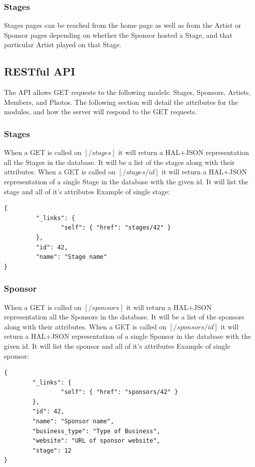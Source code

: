 \documentclass[12pt,english]{scrartcl}
\begin{document}
\subsubsection{Stages}
Stages pages can be reached from the home page as well as from the Artist or Sponsor pages depending on whether the Sponsor hosted a
Stage, and that particular Artist played on that Stage.

\subsection{RESTful  API}
The API allows GET requests to the following models: Stages, Sponsors, Artists, Members, and  Photos.
The following section will detail the attributes for the modules, and how the server will respond to the GET requests.
\subsubsection{Stages}
When a GET is called on $[/stages]$ it will return a HAL+JSON representation all the Stages in the database.  It will be a list of the stages along with their attributes.
When a GET is called on $[/stages/{id}]$ it will return a HAL+JSON representation of a single Stage in the database with the given id.  It will list the stage and all of it's attributes
Example of single stage:
\begin{verbatim}
{
         "_links": {
                "self": { "href": "stages/42" }
         },
         "id": 42,
         "name": "Stage name"
}
\end{verbatim}
\subsubsection{Sponsor}
When a GET is called on $[/sponsors]$ it will return a HAL+JSON representation all the Sponsors in the database.  It will be a list of the sponsors along with their attributes.
When a GET is called on $[/sponsors/{id}]$ it will return a HAL+JSON representation of a single Sponsor in the database with the given id.  It will list the sponsor and all of it's attributes
Example of single sponsor:
\begin{verbatim}
{
        "_links": {
                "self": { "href": "sponsors/42" }
        },
        "id": 42,
        "name": "Sponsor name",
        "business_type": "Type of Business",
        "website": "URL of sponsor website",
        "stage": 12
}
\end{verbatim}
\end{document}
